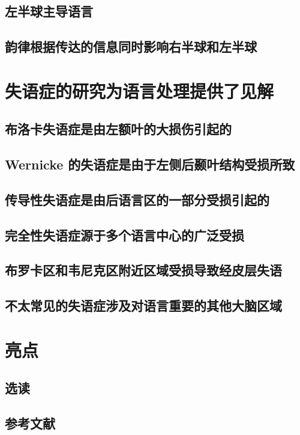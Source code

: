 \subsection{左半球主导语言}
\subsection{韵律根据传达的信息同时影响右半球和左半球}

\section{失语症的研究为语言处理提供了见解}
\subsection{布洛卡失语症是由左额叶的大损伤引起的}
\subsection{Wernicke 的失语症是由于左侧后颞叶结构受损所致}
\subsection{传导性失语症是由后语言区的一部分受损引起的}
\subsection{完全性失语症源于多个语言中心的广泛受损}
\subsection{布罗卡区和韦尼克区附近区域受损导致经皮层失语}
\subsection{不太常见的失语症涉及对语言重要的其他大脑区域}

\section{亮点}
\subsection{选读}
\subsection{参考文献}

